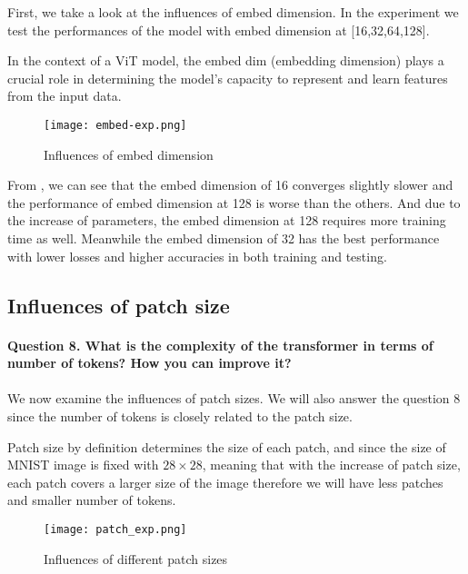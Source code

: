 \documentclass{article}
\begin{document}
First, we take a look at the influences of embed dimension. In the experiment we test the performances of the model with embed dimension at [16,32,64,128]. 

In the context of a ViT model, the embed dim (embedding dimension) plays a crucial role in determining the model's capacity to represent and learn features from the input data. 

\begin{figure}[H]
    \centering
    \texttt{[image: embed-exp.png]}
    \caption{Influences of embed dimension}
    \label{fig:emb-dim}
\end{figure}

From , we can see that the embed dimension of 16 converges slightly slower and the performance of embed dimension at 128 is worse than the others. And due to the increase of parameters, the embed dimension at 128 requires more training time as well. Meanwhile the embed dimension of 32 has the best performance with lower losses and higher accuracies in both training and testing.

\subsection{Influences of patch size}
\paragraph{Question 8. What is the complexity of the transformer in terms of number of tokens? How you can improve it?}
\paragraph{}

We now examine the influences of patch sizes. We will also answer the question 8 since the number of tokens is closely related to the patch size.

Patch size by definition determines the size of each patch, and since the size of MNIST image is fixed with \(28 \times 28\), meaning that with the increase of patch size, each patch covers a larger size of the image therefore we will have less patches and smaller number of tokens.
\begin{figure}[H]
    \centering
    \texttt{[image: patch\_exp.png]}
    \caption{Influences of different patch sizes}
    \label{fig:patch-size}
\end{figure}
\end{document}
